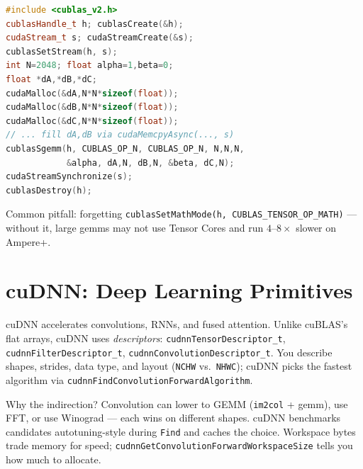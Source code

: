 \begin{lstlisting}[language=C++, caption={cuBLAS SGEMM with handle, stream, and error check. Column-major $\alpha=1,\beta=0$.}]
#include <cublas_v2.h>
cublasHandle_t h; cublasCreate(&h);
cudaStream_t s; cudaStreamCreate(&s);
cublasSetStream(h, s);
int N=2048; float alpha=1,beta=0;
float *dA,*dB,*dC;
cudaMalloc(&dA,N*N*sizeof(float));
cudaMalloc(&dB,N*N*sizeof(float));
cudaMalloc(&dC,N*N*sizeof(float));
// ... fill dA,dB via cudaMemcpyAsync(..., s)
cublasSgemm(h, CUBLAS_OP_N, CUBLAS_OP_N, N,N,N,
            &alpha, dA,N, dB,N, &beta, dC,N);
cudaStreamSynchronize(s);
cublasDestroy(h);
\end{lstlisting}

Common pitfall: forgetting \texttt{cublasSetMathMode(h, CUBLAS\_TENSOR\_OP\_MATH)} --- without it, large gemms may not use Tensor Cores and run $4$--$8\times$ slower on Ampere+.

\section{cuDNN: Deep Learning Primitives}
cuDNN accelerates convolutions, RNNs, and fused attention. Unlike cuBLAS's flat arrays, cuDNN uses \emph{descriptors}: \texttt{cudnnTensorDescriptor\_t}, \texttt{cudnnFilterDescriptor\_t}, \texttt{cudnnConvolutionDescriptor\_t}. You describe shapes, strides, data type, and layout (\texttt{NCHW} vs.\ \texttt{NHWC}); cuDNN picks the fastest algorithm via \texttt{cudnnFindConvolutionForwardAlgorithm}.

Why the indirection? Convolution can lower to GEMM (\texttt{im2col} + gemm), use FFT, or use Winograd --- each wins on different shapes. cuDNN benchmarks candidates autotuning-style during \texttt{Find} and caches the choice. Workspace bytes trade memory for speed; \texttt{cudnnGetConvolutionForwardWorkspaceSize} tells you how much to allocate.

